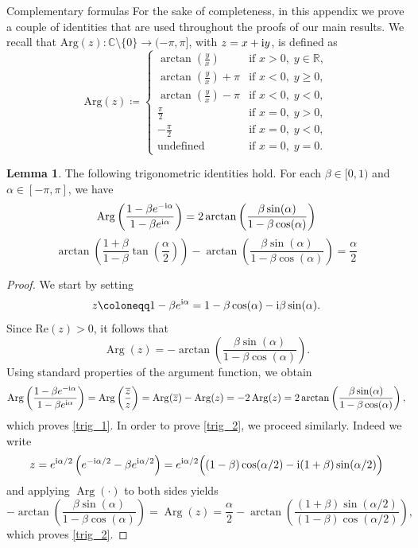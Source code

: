 \documentclass{article}
\theoremstyle{definition}
\newtheorem{lemma}[definition]{Lemma}
\renewcommand{\i}{\textnormal{i}}
\DeclareMathOperator{\Arg}{Arg}
\begin{document}
\begin{section}{Complementary formulas}\label{App_A}
For the sake of completeness, in this appendix we prove a couple of identities that are used throughout the proofs of our main results. We recall that $\mathrm{Arg}(z) : \mathbb{C} \setminus \{0\} \to (-\pi, \pi]$, with $z=x+\i y$, is defined as
$$\mathrm{Arg}(z) \coloneqq
\begin{cases}
\arctan\left(\frac{y}{x}\right) & \text{if } x > 0,\; y \in \mathbb{R}, \\
\arctan\left(\frac{y}{x}\right) + \pi & \text{if } x < 0,\; y \ge 0, \\
\arctan\left(\frac{y}{x}\right) - \pi & \text{if } x < 0,\; y < 0, \\
\frac{\pi}{2} & \text{if } x = 0,\; y > 0, \\
-\frac{\pi}{2} & \text{if } x = 0,\; y < 0, \\
\text{undefined} & \text{if } x = 0,\; y = 0.
\end{cases}$$

\begin{lemma}
    The following trigonometric identities hold. For each $\beta\in[0,1)$ and $\alpha\in[-\pi,\pi]$, we have
        \begin{equation}\label{trig_1}
        \Arg\left(\frac{1-\beta e^{-\i\alpha}}{1-\beta e^{\i\alpha}}\right)=2\arctan\left(\frac{\beta\sin(\alpha)}{1-\beta\cos(\alpha)}\right)
\end{equation}
\begin{equation}\label{trig_2}
\arctan\left(\frac{1+\beta}{1-\beta}\tan\left(\frac{\alpha}{2}\right)\right)-\arctan\left(\frac{\beta\sin(\alpha)}{1-\beta\cos(\alpha)}\right)=\frac{\alpha}{2}
\end{equation}
\end{lemma}

\begin{proof}
We start by setting
$$z\coloneqq 1-\beta e^{\i\alpha}=1-\beta\cos(\alpha)-\i\beta\sin(\alpha).$$
Since $\text{Re}(z)>0$, it follows that
$$\Arg(z)=-\arctan\left(\frac{\beta\sin(\alpha)}{1-\beta\cos(\alpha)}\right).$$
Using standard properties of the argument function, we obtain
$$\Arg\left(\frac{1-\beta e^{-\i\alpha}}{1-\beta e^{\i\alpha}}\right)
=\Arg\left(\frac{\overline{z}}{z}\right)
=\Arg(\overline{z})-\Arg(z)
=-2\Arg(z)
=2\arctan\left(\frac{\beta\sin(\alpha)}{1-\beta\cos(\alpha)}\right),$$
which proves \eqref{trig_1}. In order to prove \eqref{trig_2}, we proceed similarly. Indeed we write
$$z=e^{\i\alpha/2}\left(e^{-\i\alpha/2}-\beta e^{\i\alpha/2}\right)
=e^{\i\alpha/2}\Big((1-\beta)\cos(\alpha/2)-\i (1+\beta)\sin(\alpha/2)\Big)$$
and applying $\Arg(\cdot)$ to both sides yields
$$-\arctan\left(\frac{\beta\sin(\alpha)}{1-\beta\cos(\alpha)}\right)
=\Arg(z)
=\frac{\alpha}{2}-\arctan\left(\frac{(1+\beta)\sin(\alpha/2)}{(1-\beta)\cos(\alpha/2)}\right),$$
which proves \eqref{trig_2}.
\end{proof}




\end{section}
\end{document}
